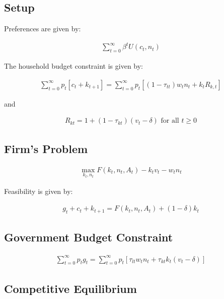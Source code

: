 \documentclass[10pt]{article}
\begin{document}


\subsection{Setup}

Preferences are given by:

\begin{align}
    \sum_{t=0}^{\infty} \beta^t U\left(c_t, n_t\right)
\end{align}

The household budget constraint is given by:

\begin{align}
    \sum_{t=0}^{\infty} p_t\left[c_t+k_{t+1}\right]=\sum_{t=0}^{\infty} p_t\left[\left(1-\tau_{t t}\right) w_t n_t+k_t R_{k, t}\right]
\end{align}

and 

\begin{align}
    R_{k t}=1+\left(1-\tau_{k t}\right)\left(v_t-\delta\right) \text { for all } t \geq 0
\end{align}

\subsection{Firm's Problem}

\begin{align}
    \max _{k_t, n_t} F\left(k_t, n_t, A_t\right)-k_t v_t-w_t n_t
\end{align}

Feasibility is given by:

\begin{align}
    g_t+c_t+k_{t+1}=F\left(k_t, n_t, A_t\right)+(1-\delta) k_t
\end{align}

\subsection{Government Budget Constraint}

\begin{align}
    \sum_{t=0}^{\infty} p_t g_t=\sum_{t=0}^{\infty} p_t\left[\tau_{l t} w_t n_t+\tau_{k t} k_t\left(v_t-\delta\right)\right]
\end{align}

\subsection{Competitive Equilibrium}
\end{document}
